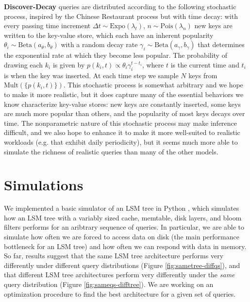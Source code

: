 \documentclass{sig-alternate-05-2015}
\begin{document}
\textbf{Discover-Decay} queries are distributed according to the following
stochastic process, inspired by the Chinese Restaurant process \cite{crp} but
with time decay: with every passing time increment $\Delta t \sim
\textrm{Expo}(\lambda_t)$, $n \sim \textrm{Pois}(\lambda_n)$ new keys are written to the
key-value store, which each have an inherent popularity $\theta_i \sim
\textrm{Beta}(a_\theta,b_\theta)$ with a random decay rate $\gamma_i \sim
\textrm{Beta}(a_\gamma,b_\gamma)$ that determines the exponential rate at which they
become less popular. The probability of drawing each $k_i$ is given by
$p(k_i,t) \propto \theta_i\gamma_i^{t-t_i}$, where $t$ is the current time and
$t_i$ is when the key was inserted. At each time step we sample $N$ keys from
$\textrm{Mult}(\{p(k_i,t)\})$. This stochastic process is somewhat arbitrary and we
hope to make it more realistic, but it does capture many of the essential
behaviors we know characterize key-value stores: new keys are constantly
inserted, some keys are much more popular than others, and the popularity of
most keys decays over time. The nonparametric nature of this stochastic process
may make inference difficult, and we also hope to enhance it to make it more
well-suited to realistic workloads (e.g. that exhibit daily periodicity), but
it seems much more able to simulate the richness of realistic queries than many
of the other models.

\section{Simulations}

We implemented a basic simulator of an LSM tree in Python \cite{lsmulator},
which simulates how an LSM tree with a variably sized cache, memtable, disk
layers, and bloom filters performs for an aribtrary sequence of queries. In
particular, we are able to simulate how often we are forced to access data on
disk (the main performance bottleneck for an LSM tree) and how often we can
respond with data in memory. So far, results suggest that the same LSM tree
architecture performs very differently under different query distributions
(Figure \ref{fig:sametree-diffqs}), and that different LSM tree architectures
perform very differently under the \textit{same} query distribution (Figure
\ref{fig:sameqs-difftree}). We are working on an optimization procedure to find
the best architecture for a given set of queries.
\end{document}
